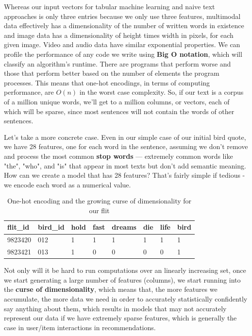 \documentclass[11pt, table]{diazessay} %
\begin{document}
\begin{sloppypar}
Whereas our input vectors for tabular machine learning and naive text approaches is only three entries because we only use three features, multimodal data effectively has a dimensionality of the number of written words in existence and image data has a dimensionality of height times width in pixels, for each given image. Video and audio data have similar exponential properties.  We can profile the performance of any code we write using \textbf{Big O notation}, which will classify an algorithm's runtime.  There are programs that perform worse and those that perform better based on the number of elements the program processes. This means that one-hot encodings, in terms of computing performance, are \begin{math}O(n)\end{math} in the worst case complexity. So, if our text is a corpus of a million unique words, we'll get to a million columns, or vectors, each of which will be sparse, since most sentences will not contain the words of other sentences.   

Let's take a more concrete case. Even in our simple case of our initial bird quote, we have 28 features, one for each word in the sentence, assuming we don't remove and process the most common \textbf{stop words} --- extremely common words like "the", "who", and "is" that appear in most texts but don't add semantic meaning.  How can we create a model that has 28 features? That's fairly simple if tedious - we encode each word as a numerical value. 

  \begin{table}[H]
    \centering
        \caption{One-hot encoding and the growing curse of dimensionality for our flit}
\begin{tabular}{|l|l|l|l|l|l|l|l|}
\hline
\rowcolor[HTML]{D5E7F7}  
flit\_id & bird\_id & hold & fast & dreams & die & life & bird \\ \hline
9823420  & 012  & 1   & 1    & 1      & 1  & 1        & 1   \\ \hline
9823421  & 013  & 1   & 0    & 0      & 0  & 0        & 1   \\ \hline
\end{tabular}

\end{table}

Not only will it be hard to run computations over an linearly increasing set, once we start generating a large number of features (columns), we start running into the \textbf{curse of dimensionality}, which means that, the more features we accumulate, the more data we need in order to accurately statistically confidently say anything about them, which results in models that may not accurately represent our data\citep{houle2010can} if we have extremely sparse features, which is generally the case in user/item interactions in recommendations.   


\end{sloppypar}
\end{document}
